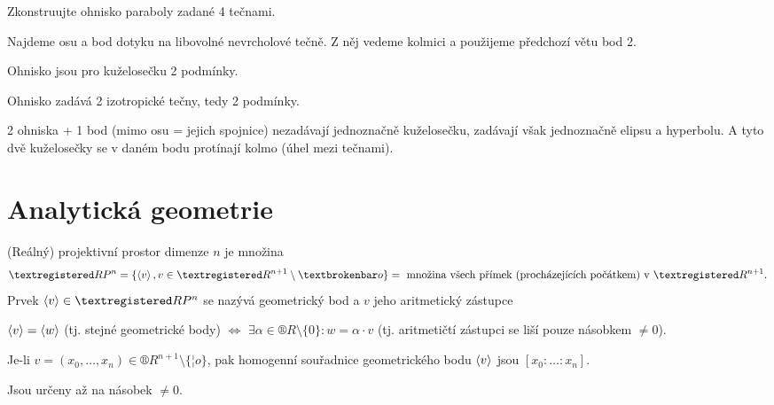 \documentclass[12pt]{article}					%
\begin{document}
\begin{priklad}[Konstrukce]
	Zkonstruujte ohnisko paraboly zadané 4 tečnami.

	\begin{reseni}
		Najdeme osu a bod dotyku na libovolné nevrcholové tečně. Z něj vedeme kolmici a použijeme předchozí větu bod 2.
	\end{reseni}
\end{priklad}

\begin{veta}
	Ohnisko jsou pro kuželosečku 2 podmínky.

	\begin{dukazin}
		Ohnisko zadává 2 izotropické tečny, tedy 2 podmínky.
	\end{dukazin}

	\begin{poznamkain}
		2 ohniska + 1 bod (mimo osu = jejich spojnice) nezadávají jednoznačně kuželosečku, zadávají však jednoznačně elipsu a hyperbolu. A tyto dvě kuželosečky se v daném bodu protínají kolmo (úhel mezi tečnami).
	\end{poznamkain}
\end{veta}


\section{Analytická geometrie}
\begin{definice}
	(Reálný) projektivní prostor dimenze $n$ je množina
	$$ ®RP^n = \{\<v\>, v \in ®R^{n+1} \setminus ¦o\} = \text{ množina všech přímek (procházejících počátkem) v } ®R^{n+1}. $$
	Prvek $\<v\> \in ®RP^n$ se nazývá geometrický bod a $v$ jeho aritmetický zástupce

	\begin{poznamkain}[Platí]
		$\left\langle v\right\rangle = \left\langle w\right\rangle$ (tj. stejné geometrické body) $\Leftrightarrow$ $\exists α \in ®R \setminus \{0\}: w = α·v$ (tj. aritmetičtí zástupci se liší pouze násobkem $≠ 0$).
	\end{poznamkain}
\end{definice}

\begin{definice}
	Je-li $v = (x_0, …, x_n) \in ®R^{n+1} \setminus \{¦o\}$, pak homogenní souřadnice geometrického bodu $\left\langle v\right\rangle$ jsou $[x_0:…:x_n]$.

	\begin{poznamkain}
		Jsou určeny až na násobek $≠0$.
	\end{poznamkain}
\end{definice}
\end{document}

